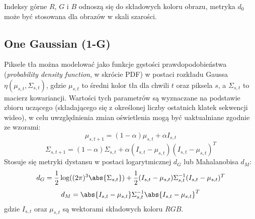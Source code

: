 Indeksy górne $R$, $G$ i $B$ odnoszą się do składowych koloru obrazu, metryka $d_0$ może być stosowana dla obrazów w skali szarości.

\subsection{One Gaussian (1-G)}
\label{subsec:oneGauss}
Piksele tła można modelować jako funkcje gęstości prawdopodobieństwa (\textit{probability density function}, w skrócie PDF) w postaci rozkładu Gaussa $\eta(\mu_{s,t},\Sigma_{s,t})$, gdzie $\mu_{s,t}$ to średni kolor tła dla chwili $t$ oraz piksela $s$, a $\Sigma_{s,t}$ to macierz kowariancji. Wartości tych parametrów są wyznaczane na podstawie zbioru uczącego (składającego się z określonej liczby ostatnich klatek sekwencji wideo), w celu uwzględnienia zmian oświetlenia mogą być uaktualniane zgodnie ze wzorami:
\begin{equation}
	\mu_{s,t+1} = (1-\alpha)\mu_{s,t} + \alpha I_{s,t}
\end{equation}
\begin{equation}
	\Sigma_{s,t+1} = (1-\alpha)\Sigma_{s,t} + \alpha(I_{s,t}-\mu_{s,t})(I_{s,t}-				\mu_{s,t})^T
\end{equation}
Stosuje się metryki dystansu w postaci logarytmicznej $d_G$ lub Mahalanobisa $d_M$:
\begin{equation}
	d_G =  \frac{1}{2}\log((2\pi)^3\abs{\Sigma_{s,t}}) + \frac{1}{2}(I_{s,t}-\mu_{s,t})			\Sigma_{s,t}^{-1}(I_{s,t} - \mu_{s,t})^{T}
\end{equation} 
\begin{equation}
	d_M = \abs{I_{s,t}-\mu_{s,t}}\Sigma_{s,t}^{-1}\abs{I_{s,t}-\mu_{s,t}}^{T}
\end{equation}
gdzie $I_{s,t}$ oraz $\mu_{s,t}$ są wektorami składowych koloru $RGB$. 

